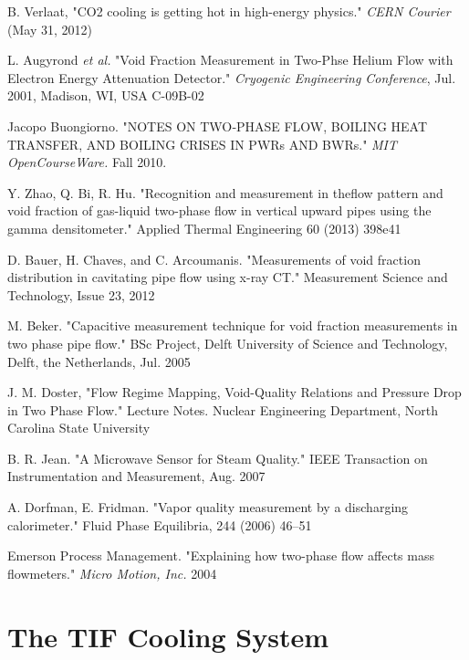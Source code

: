 \documentclass{report}
\begin{document}
\begin{itemize}
\begin{thebibliography}{9}
B. Verlaat, "CO2 cooling is getting hot in high-energy physics." \textit{CERN Courier} (May 31, 2012)

L. Augyrond \textit{et al.} "Void Fraction Measurement in Two-Phse Helium Flow with Electron Energy Attenuation Detector." \textit{Cryogenic Engineering Conference}, Jul. 2001, Madison, WI, USA C-09B-02

Jacopo Buongiorno. "NOTES ON TWO‐PHASE FLOW, BOILING HEAT TRANSFER, AND BOILING CRISES
IN PWRs AND BWRs." \textit{MIT OpenCourseWare.} Fall 2010.

Y. Zhao, Q. Bi, R. Hu. "Recognition and measurement in theflow pattern and void fraction of gas-liquid two-phase flow in vertical upward pipes using the gamma densitometer." Applied Thermal Engineering 60 (2013) 398e41

D. Bauer, H. Chaves, and C. Arcoumanis. "Measurements of void fraction distribution in cavitating pipe flow
using x-ray CT." Measurement Science and Technology, Issue 23, 2012

M. Beker. "Capacitive measurement technique for void fraction measurements in two phase pipe flow." BSc Project, Delft University of Science and Technology, Delft, the Netherlands, Jul. 2005

J. M. Doster, "Flow Regime Mapping, Void-Quality Relations and Pressure Drop in Two Phase Flow." Lecture Notes. Nuclear Engineering Department, North Carolina State University 

B. R. Jean. "A Microwave Sensor for Steam Quality." IEEE Transaction on Instrumentation and Measurement, Aug. 2007

A. Dorfman, E. Fridman. "Vapor quality measurement by a discharging calorimeter." Fluid Phase Equilibria, 244 (2006) 46–51

Emerson Process Management. "Explaining how two-phase flow affects mass flowmeters." \textit{Micro Motion, Inc.} 2004

\end{thebibliography}
\appendix
\chapter{The TIF Cooling System}\label{app:TIF}


%
%


\end{itemize}
\end{document}
